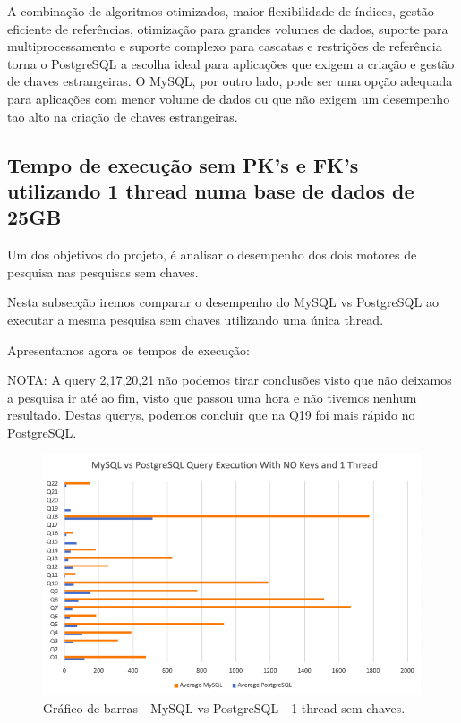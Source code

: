 \documentclass{article}
\begin{document}
A combinação de algoritmos otimizados, maior flexibilidade de índices, gestão eficiente de referências, otimização para grandes volumes de dados, suporte para multiprocessamento e suporte complexo para cascatas  e restrições de referência torna o PostgreSQL a escolha ideal para aplicações que exigem a criação e gestão de chaves estrangeiras. O MySQL, por outro lado, pode ser uma opção adequada para aplicações com menor volume de dados ou que não exigem um desempenho tao alto na criação de chaves estrangeiras.\\


\subsection{Tempo de execução sem PK's e FK's utilizando 1 thread numa base
de dados de 25GB}

\texttt{}\par Um dos objetivos do projeto, é analisar o desempenho dos dois motores de pesquisa nas pesquisas sem chaves.

Nesta subsecção iremos comparar o desempenho do MySQL vs PostgreSQL ao executar a mesma pesquisa sem chaves utilizando uma única thread.

Apresentamos agora os tempos de execução:

NOTA: A query 2,17,20,21 não podemos tirar conclusões visto que não deixamos a pesquisa ir até ao fim, visto que passou uma hora e não tivemos nenhum resultado. Destas querys, podemos concluir que na Q19 foi mais rápido no PostgreSQL.
\begin{figure}[H]
  \centering
  \includegraphics[width=\textwidth]{Graphs/mysqlvspostgres_withoutkeys_onethread.png}
  \caption{Gráfico de barras - MySQL vs PostgreSQL - 1 thread sem chaves.}
  \label{fig:PKCreation2}
\end{figure}
\end{document}
